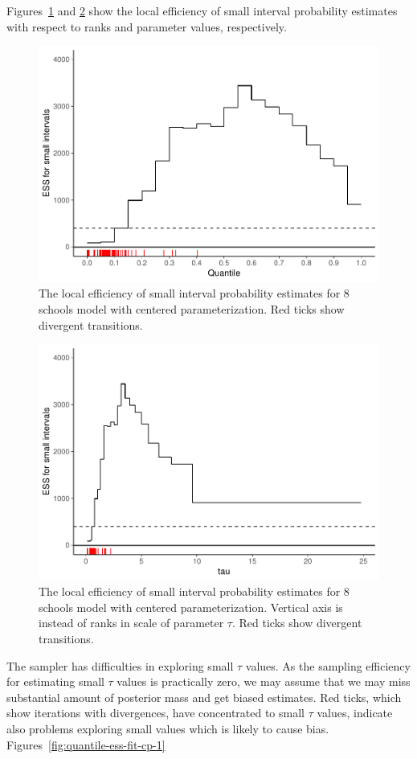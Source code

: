 \documentclass[american,]{article}
\begin{document}
Figures~\ref{fig:local-ess-fit-cp-1} and
\ref{fig:local-ess-fit-cp-norank-1} show the local efficiency of small
interval probability estimates with respect to ranks and parameter
values, respectively.
\begin{figure}[tp]
  \centering
  \includegraphics[width=0.6\linewidth]{graphics/local-ess-fit-cp-1.pdf}
  \caption{The local efficiency of small interval probability estimates for 8 schools model with centered parameterization. Red ticks show divergent transitions.}
  \label{fig:local-ess-fit-cp-1}
\end{figure}
\begin{figure}[tp]
  \centering
  \includegraphics[width=0.6\linewidth]{graphics/local-ess-fit-cp-norank-1.pdf}
  \caption{The local efficiency of small interval probability estimates for 8 schools model with centered parameterization. Vertical axis is instead of ranks in scale of parameter $\tau$. Red ticks show divergent transitions.}
  \label{fig:local-ess-fit-cp-norank-1}
\end{figure}
The sampler has difficulties in exploring small $\tau$
values. As the sampling efficiency for estimating small $\tau$
values is practically zero, we may assume that we may miss substantial
amount of posterior mass and get biased estimates. Red ticks, which show
iterations with divergences, have concentrated to small $\tau$
values, indicate also problems exploring small values which is likely to
cause bias.
%
Figures~\ref{fig:quantile-ess-fit-cp-1}
\end{document}
